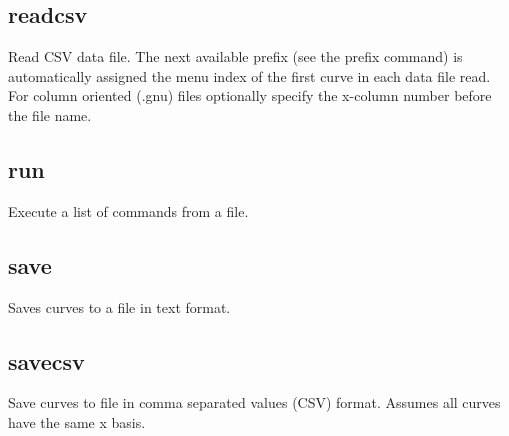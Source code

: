 \documentclass[letterpaper,10pt,english]{sphinxmanual}
\begin{document}
\subsection{readcsv}
\label{\detokenize{io_commands:readcsv}}
Read CSV data file. The next available prefix (see the prefix command) is automatically assigned the menu index of the first curve in each data file read. For column oriented (.gnu) files optionally specify the x-column number before the file name. 

\begin{sphinxVerbatim}[commandchars=\\\{\}]
\PYG{p}{[}\PYG{p}{]}  \PYG{p}{[}\PYG{p}{]} 
\end{sphinxVerbatim}


\subsection{run}
\label{\detokenize{io_commands:run}}
Execute a list of commands from a file.

\begin{sphinxVerbatim}[commandchars=\\\{\}]
\PYG{p}{[}\PYG{p}{]}  
\end{sphinxVerbatim}


\subsection{save}
\label{\detokenize{io_commands:save}}
Saves curves to a file in text format.

\begin{sphinxVerbatim}[commandchars=\\\{\}]
\PYG{p}{[}\PYG{p}{]}   
\end{sphinxVerbatim}


\subsection{savecsv}
\label{\detokenize{io_commands:savecsv}}
Save curves to file in comma separated values (CSV) format. Assumes all curves have the same x basis.
\end{document}
